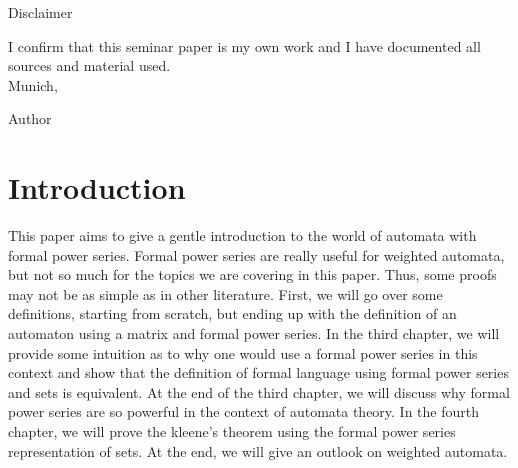 \documentclass[12pt,letterpaper]{article}
\begin{document}
\vspace{1,5cm}
\cleardoublepage{}
\thispagestyle{empty}
\vspace*{0.8\textheight}
\noindent
\makeatletter
\begin{center}
{\normalfont\bfseries} Disclaimer
\end{center}
\begin{flushleft}
I confirm that this seminar paper is my own work and I have documented all sources and material used.\\
\makeatother
\vspace{15mm}
\noindent
Munich, \date{\today} \hspace{50mm} Author
\end{flushleft}
\cleardoublepage{}

\newpage
\tableofcontents
\newpage

\setcounter{page}{1}
\pagestyle{fancy}
\fancyhf{}
\fancyhead[R]{\thepage}
\renewcommand{\headrulewidth}{0pt} %

\section{Introduction}
This paper aims to give a gentle introduction to the world of
automata with formal power series. Formal power series are really
useful for weighted automata, but not so much for the topics we are
covering in this paper. Thus, some proofs may not be as simple as in 
other literature. First, we will go over some definitions, starting
from scratch, but ending up with the definition of an automaton using
a matrix and  formal power series. In the third chapter, we will
provide some intuition as to why one would use a formal power
series in this context and show that the definition of formal 
language using formal power series and sets is equivalent.
At the end of the third chapter, we will discuss why formal power 
series are so powerful in the context of automata theory.
In the fourth chapter, we will prove the kleene's theorem using the
formal power series representation of sets. 
At the end, we will give  an outlook on weighted automata.
\end{document}
